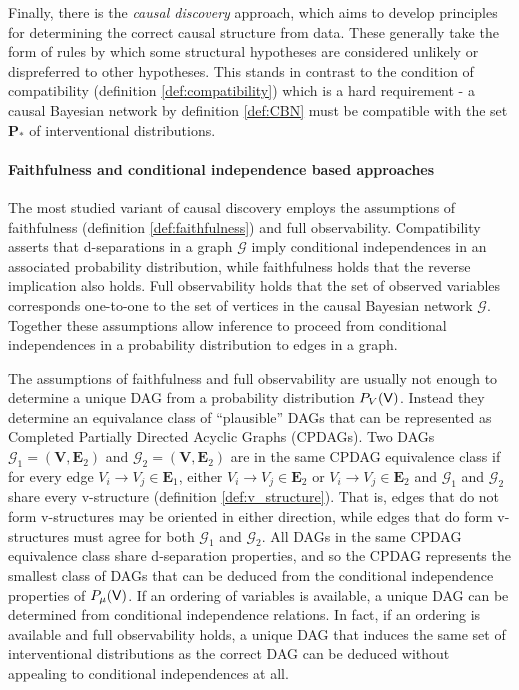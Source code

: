 Finally, there is the \emph{causal discovery} approach, which aims to develop principles for determining the correct causal structure from data. These generally take the form of rules by which some structural hypotheses are considered unlikely or dispreferred to other hypotheses. This stands in contrast to the condition of compatibility (definition \ref{def:compatibility}) which is a hard requirement - a causal Bayesian network by definition \ref{def:CBN} must be compatible with the set $\mathbf{P}_*$ of interventional distributions.

\paragraph{Faithfulness and conditional independence based approaches}

The most studied variant of causal discovery employs the assumptions of faithfulness (definition \ref{def:faithfulness}) and full observability. Compatibility asserts that d-separations in a graph $\mathcal{G}$ imply conditional independences in an associated probability distribution, while faithfulness holds that the reverse implication also holds. Full observability holds that the set of observed variables corresponds one-to-one to the set of vertices in the causal Bayesian network $\mathcal{G}$. Together these assumptions allow inference to proceed from conditional independences in a probability distribution to edges in a graph.

The assumptions of faithfulness and full observability are usually not enough to determine a unique DAG from a probability distribution $P_V(\mathsf{V})$. Instead they determine an equivalance class of ``plausible'' DAGs that can be represented as Completed Partially Directed Acyclic Graphs (CPDAGs). Two DAGs $\mathcal{G}_1=(\mathbf{V},\mathbf{E}_2)$ and $\mathcal{G}_2=(\mathbf{V},\mathbf{E}_2)$ are in the same CPDAG equivalence class if for every edge $V_i\to V_j\in \mathbf{E}_1$, either $V_i\to V_j\in \mathbf{E}_2$ or $V_i\to V_j\in \mathbf{E}_2$ and $\mathcal{G}_1$ and $\mathcal{G}_2$ share every v-structure (definition \ref{def:v_structure})\cite{pearl_causality:_2009}. That is, edges that do not form v-structures may be oriented in either direction, while edges that do form v-structures must agree for both $\mathcal{G}_1$ and $\mathcal{G}_2$. All DAGs in the same CPDAG equivalence class share d-separation properties, and so the CPDAG represents the smallest class of DAGs that can be deduced from the conditional independence properties of $P_\mu(\mathsf{V})$. If an ordering of variables is available, a unique DAG can be determined from conditional independence relations\cite{spirtes_algorithm_1991}. In fact, if an ordering is available and full observability holds, a unique DAG that induces the same set of interventional distributions as the correct DAG can be deduced without appealing to conditional independences at all\cite{peters_structural_2013,bareinboim_local_2012}.

